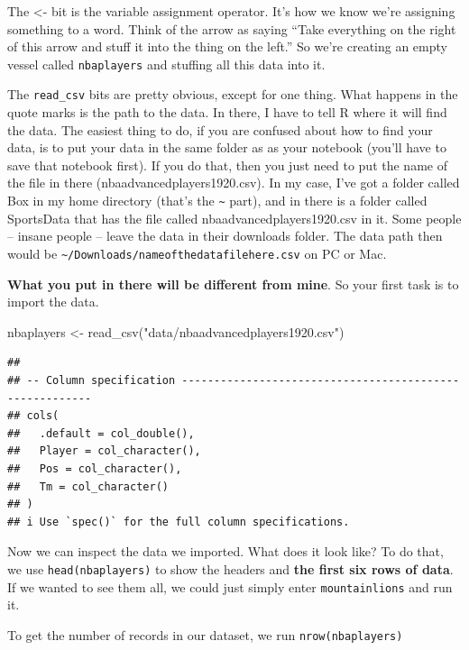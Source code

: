 \documentclass[
]{book}
\newenvironment{Shaded}{\begin{snugshade}}{\end{snugshade}}
\newcommand{\FunctionTok}[1]{\textcolor[rgb]{0.00,0.00,0.00}{#1}}
\newcommand{\NormalTok}[1]{#1}
\newcommand{\OtherTok}[1]{\textcolor[rgb]{0.56,0.35,0.01}{#1}}
\newcommand{\StringTok}[1]{\textcolor[rgb]{0.31,0.60,0.02}{#1}}
\begin{document}
The \textless- bit is the variable assignment operator. It's how we know we're assigning something to a word. Think of the arrow as saying ``Take everything on the right of this arrow and stuff it into the thing on the left.'' So we're creating an empty vessel called \texttt{nbaplayers} and stuffing all this data into it.

The \texttt{read\_csv} bits are pretty obvious, except for one thing. What happens in the quote marks is the path to the data. In there, I have to tell R where it will find the data. The easiest thing to do, if you are confused about how to find your data, is to put your data in the same folder as as your notebook (you'll have to save that notebook first). If you do that, then you just need to put the name of the file in there (nbaadvancedplayers1920.csv). In my case, I've got a folder called Box in my home directory (that's the \texttt{\textasciitilde{}} part), and in there is a folder called SportsData that has the file called nbaadvancedplayers1920.csv in it. Some people -- insane people -- leave the data in their downloads folder. The data path then would be \texttt{\textasciitilde{}/Downloads/nameofthedatafilehere.csv} on PC or Mac.

\textbf{What you put in there will be different from mine}. So your first task is to import the data.

\begin{Shaded}
\begin{Highlighting}[]
\NormalTok{nbaplayers }\OtherTok{\textless{}{-}} \FunctionTok{read\_csv}\NormalTok{(}\StringTok{"data/nbaadvancedplayers1920.csv"}\NormalTok{)}
\end{Highlighting}
\end{Shaded}

\begin{verbatim}
## 
## -- Column specification --------------------------------------------------------
## cols(
##   .default = col_double(),
##   Player = col_character(),
##   Pos = col_character(),
##   Tm = col_character()
## )
## i Use `spec()` for the full column specifications.
\end{verbatim}

Now we can inspect the data we imported. What does it look like? To do that, we use \texttt{head(nbaplayers)} to show the headers and \textbf{the first six rows of data}. If we wanted to see them all, we could just simply enter \texttt{mountainlions} and run it.

To get the number of records in our dataset, we run \texttt{nrow(nbaplayers)}
\end{document}
